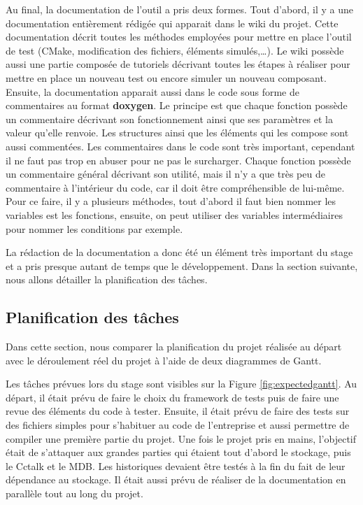 \documentclass[a4paper]{article}
\begin{document}
Au final, la documentation de l'outil a pris deux formes. Tout d'abord, il y a
une documentation entièrement rédigée qui apparait dans le wiki du projet.
Cette documentation décrit toutes les méthodes employées pour mettre en place
l'outil de test (CMake, modification des fichiers, éléments simulés,\dots). Le
wiki possède aussi une partie composée de tutoriels décrivant toutes les étapes
à réaliser pour mettre en place un nouveau test ou encore simuler un nouveau
composant. Ensuite, la documentation apparait aussi dans le code sous forme de
commentaires au format \textbf{doxygen}. Le principe est que chaque fonction
possède un commentaire décrivant son fonctionnement ainsi que ses paramètres et
la valeur qu'elle renvoie. Les structures ainsi que les éléments qui les compose
sont aussi commentées. Les commentaires dans le code sont très important,
cependant il ne faut pas trop en abuser pour ne pas le surcharger. Chaque
fonction possède un commentaire général décrivant son utilité, mais il n'y a que
très peu de commentaire à l'intérieur du code, car il doit être compréhensible de
lui-même. Pour ce faire, il y a plusieurs méthodes, tout d'abord il faut bien
nommer les variables est les fonctions, ensuite, on peut utiliser des variables
intermédiaires pour nommer les conditions par exemple.

La rédaction de la documentation a donc été un élément très important du stage
et a pris presque autant de temps que le développement. Dans la section
suivante, nous allons détailler la planification des tâches.

\clearpage
\subsection{Planification des tâches}%

Dans cette section, nous comparer la planification du projet réalisée au départ
avec le déroulement réel du projet à l'aide de deux diagrammes de Gantt.

Les tâches prévues lors du stage sont visibles sur la Figure
\ref{fig:expectedgantt}. Au départ, il était prévu de faire le choix du
framework de tests puis de faire une revue des éléments du code à tester.
Ensuite, il était prévu de faire des tests sur des fichiers simples pour
s'habituer au code de l'entreprise et aussi permettre de compiler une première
partie du projet. Une fois le projet pris en mains, l'objectif était de
s'attaquer aux grandes parties qui étaient tout d'abord le stockage, puis le
Cctalk et le MDB. Les historiques devaient être testés à la fin du fait de leur
dépendance au stockage. Il était aussi prévu de réaliser de la documentation en
parallèle tout au long du projet.
\end{document}
